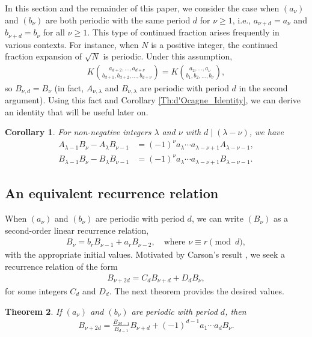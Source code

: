 \documentclass[12pt]{article}
\theoremstyle{plain}
\newtheorem{theorem}{Theorem}
\newtheorem{corollary}[theorem]{Corollary}
\theoremstyle{definition}
\theoremstyle{remark}
\begin{document}
In this section and the remainder of this paper, we consider the case when $ (a_\nu) $ and $ (b_\nu) $ are both periodic with the same period $ d $ for $ \nu \geq 1 $, i.e., $ a_{\nu + d} = a_\nu $ and $ b_{\nu + d} = b_\nu $ for all $ \nu \geq 1 $. This type of continued fraction arises frequently in various contexts. For instance, when $ N $ is a positive integer, the continued fraction expansion of $ \sqrt{N} $ is periodic. Under this assumption,
\begin{align*}
	K \binom{a_{d + 2}, \ldots, a_{d + \nu}}{b_{d + 1}, b_{d + 2}, \ldots, b_{d + \nu}} = K \binom{a_2, \ldots, a_\nu}{b_1, b_2, \ldots, b_\nu},
\end{align*}
so $ B_{\nu, d} = B_\nu $ (in fact, $ A_{\nu, \lambda} $ and $ B_{\nu, \lambda} $ are periodic with period $ d $ in the second argument). Using this fact and  Corollary \ref{Th:d'Ocagne_Identity}, we can derive an identity that will be useful later on.
\begin{corollary} \label{Th:Telescoping_Sum} For non-negative integers $ \lambda $ and $ \nu $ with $ d \mid (\lambda - \nu) $, we have
\begin{align*}
	A_{\lambda - 1} B_\nu - A_\lambda B_{\nu - 1} &= (-1)^\nu a_\lambda \cdots a_{\lambda - \nu + 1} A_{\lambda - \nu - 1}, \\
	B_{\lambda - 1} B_\nu - B_\lambda B_{\nu - 1} &= (-1)^\nu a_\lambda \cdots a_{\lambda - \nu + 1} B_{\lambda - \nu - 1}.
\end{align*}
\end{corollary}

\subsection{An equivalent recurrence relation} \label{Sec:An_Equivalent_Recurrence_Relation}

When $ (a_\nu) $ and $ (b_\nu) $ are periodic with period $ d $, we can write $ (B_\nu) $ as a second-order linear recurrence relation, 
\begin{align*}
	B_\nu = b_r B_{\nu - 1} + a_r B_{\nu - 2}, \quad \text{where } \nu \equiv r \pmod{d},
\end{align*}
with the appropriate initial values. Motivated by Carson's result \cite{Carson_07}, we seek a recurrence relation of the form
\begin{align*}
	B_{\nu + 2d} = C_d B_{\nu + d} + D_d B_\nu,
\end{align*}
for some integers $ C_d $ and $ D_d $. The next theorem provides the desired values.
\begin{theorem} \label{Th:Single_Reccurence} If $ (a_\nu) $ and $ (b_\nu) $ are periodic with period $ d $, then 
\begin{align*}
	B_{\nu + 2d} = \frac{B_{2d - 1}}{B_{d - 1}} B_{\nu + d} + (-1)^{d - 1} a_1 \cdots a_d B_\nu.
\end{align*}
\end{theorem}
\end{document}
